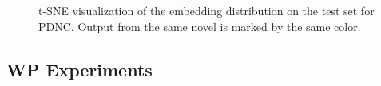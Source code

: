 \documentclass[letterpaper]{article} %
\begin{document}
\begin{figure}[htbp!]
\centering
{}
\quad
{}
\caption{t-SNE visualization of the embedding distribution on the test set for PDNC. Output from the same novel is marked by the same color.}
\label{visualization}
\end{figure}





\subsection{WP Experiments}
\label{ssec:wp}
\end{document}

